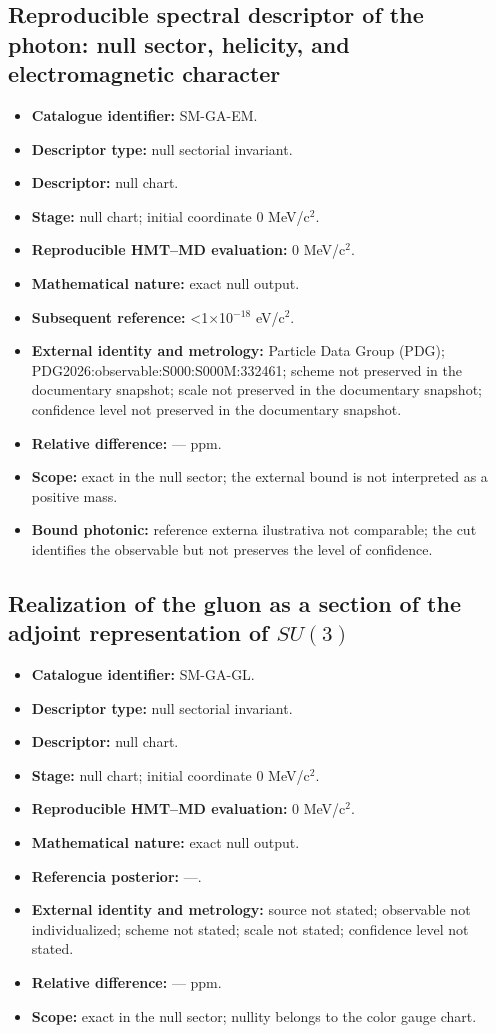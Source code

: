 \subsection{Reproducible spectral descriptor of the photon: null sector, helicity, and electromagnetic character}
\begin{itemize}
\item \textbf{Catalogue identifier:} SM-GA-EM.
\item \textbf{Descriptor type:} null sectorial invariant.
\item \textbf{Descriptor:} null chart.
\item \textbf{Stage:} null chart; initial coordinate 0 MeV/c\({}^{2}\).
\item \textbf{Reproducible HMT--MD evaluation:} 0 MeV/c\({}^{2}\).
\item \textbf{Mathematical nature:} exact null output.
\item \textbf{Subsequent reference:} <1×10\({}^{-18}\) eV/c\({}^{2}\).
\item \textbf{External identity and metrology:} Particle Data Group (PDG); PDG2026:\allowbreak{}observable:\allowbreak{}S000:\allowbreak{}S000M:\allowbreak{}332461; scheme not preserved in the documentary snapshot; scale not preserved in the documentary snapshot; confidence level not preserved in the documentary snapshot.
\item \textbf{Relative difference:} --- ppm.
\item \textbf{Scope:} exact in the null sector; the external bound is not interpreted as a positive mass.
\item \textbf{Bound photonic:} reference externa ilustrativa not comparable; the cut identifies the observable but not preserves the level of confidence.
\end{itemize}
\subsection{Realization of the gluon as a section of the adjoint representation of \(SU(3)\)}
\begin{itemize}
\item \textbf{Catalogue identifier:} SM-GA-GL.
\item \textbf{Descriptor type:} null sectorial invariant.
\item \textbf{Descriptor:} null chart.
\item \textbf{Stage:} null chart; initial coordinate 0 MeV/c\({}^{2}\).
\item \textbf{Reproducible HMT--MD evaluation:} 0 MeV/c\({}^{2}\).
\item \textbf{Mathematical nature:} exact null output.
\item \textbf{Referencia posterior:} ---.
\item \textbf{External identity and metrology:} source not stated; observable not individualized; scheme not stated; scale not stated; confidence level not stated.
\item \textbf{Relative difference:} --- ppm.
\item \textbf{Scope:} exact in the null sector; nullity belongs to the color gauge chart.
\end{itemize}
